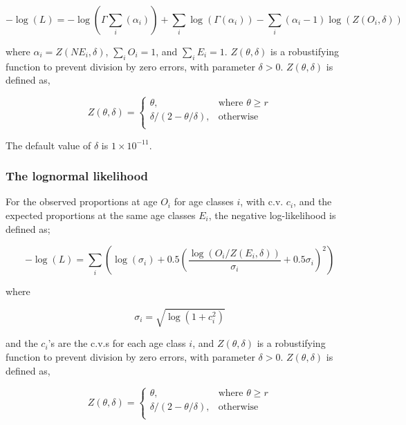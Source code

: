 \begin{equation}
-\log \left(L \right) = -\log(\Gamma \sum\limits_i (\alpha_i)) + \sum\limits_i \log(\Gamma (\alpha_i)) - \sum\limits_i (\alpha_i-1) \log(Z(O_i,\delta))
\end{equation}

where $\alpha_i = Z \left(N E_i,\delta \right)$, $\sum\limits_i O_i = 1$, and $\sum\limits_i E_i = 1$. $Z \left(\theta,\delta \right)$ is a robustifying function to prevent division by zero errors, with parameter $\delta>0$. $Z \left(\theta,\delta \right)$ is defined as,

\begin{equation}
Z \left(\theta,\delta \right) = \begin{cases}
\theta, & \text{where $\theta \ge r$} \\
\delta/\left( 2-\theta/\delta \right), & \text{otherwise} \\  
\end{cases}
\end{equation}

The default value of $\delta$ is $1 \times 10^{-11}$.

\subsubsection*{The lognormal likelihood}

For the observed proportions at age $O_i$ for age classes $i$, with c.v. $c_i$, and the expected proportions at the same age classes $E_i$, the negative log-likelihood is defined as; 

\begin{equation}
- \log \left(L \right) = \sum\limits_i \left( \log \left( \sigma _i \right) + 0.5\left( \frac{\log \left(O_i / Z \left(E_i,\delta \right) \right)}{\sigma_i} + 0.5 \sigma_i \right)^2 \right)
\end{equation}

where 

\begin{equation}
\sigma_i  = \sqrt{\log \left(1+c_i^2 \right)}
\end{equation}

and the $c_i$'s are the c.v.s for each age class $i$, and $Z \left(\theta,\delta \right)$ is a robustifying function to prevent division by zero errors, with parameter $\delta>0$. $Z \left(\theta,\delta \right)$ is defined as,

\begin{equation}
Z \left(\theta,\delta \right) = \begin{cases}
\theta, & \text{where $\theta \ge r$} \\
\delta/\left( 2-\theta/\delta \right), & \text{otherwise} \\  
\end{cases}
\end{equation}

